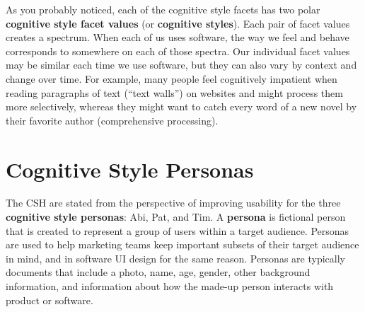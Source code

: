 As you probably noticed, each of the cognitive style facets has two polar \textbf{cognitive style facet values} (or \textbf{cognitive styles}). Each pair of facet values creates a spectrum. When each of us uses software, the way we feel and behave corresponds to somewhere on each of those spectra. Our individual facet values may be similar each time we use software, but they can also vary by context and change over time. For example, many people feel cognitively impatient when reading paragraphs of text (``text walls'') on websites and might process them more selectively, whereas they might want to catch every word of a new novel by their favorite author (comprehensive processing). 

\section{Cognitive Style Personas}

The CSH are stated from the perspective of improving usability for the three \textbf{cognitive style personas}: Abi, Pat, and Tim. A \textbf{persona} is fictional person that is created to represent a group of users within a target audience. Personas are used to help marketing teams keep important subsets of their target audience in mind, and in software UI design for the same reason. Personas are typically documents that include a photo, name, age, gender, other background information, and information about how the made-up person interacts with product or software.

